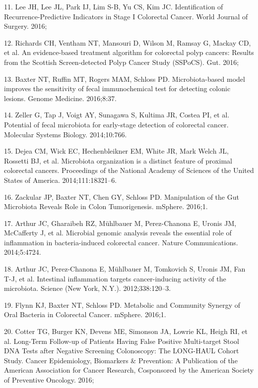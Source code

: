 \documentclass[12pt,]{article}
\begin{document}
\hypertarget{ref-lee_identification_2016}{}
11. Lee JH, Lee JL, Park IJ, Lim S-B, Yu CS, Kim JC. Identification of
Recurrence-Predictive Indicators in Stage I Colorectal Cancer. World
Journal of Surgery. 2016;

\hypertarget{ref-richards_evidence-based_2016}{}
12. Richards CH, Ventham NT, Mansouri D, Wilson M, Ramsay G, Mackay CD,
et al. An evidence-based treatment algorithm for colorectal polyp
cancers: Results from the Scottish Screen-detected Polyp Cancer Study
(SSPoCS). Gut. 2016;

\hypertarget{ref-baxter_microbiota-based_2016}{}
13. Baxter NT, Ruffin MT, Rogers MAM, Schloss PD. Microbiota-based model
improves the sensitivity of fecal immunochemical test for detecting
colonic lesions. Genome Medicine. 2016;8:37.

\hypertarget{ref-zeller_potential_2014}{}
14. Zeller G, Tap J, Voigt AY, Sunagawa S, Kultima JR, Costea PI, et al.
Potential of fecal microbiota for early-stage detection of colorectal
cancer. Molecular Systems Biology. 2014;10:766.

\hypertarget{ref-dejea_microbiota_2014}{}
15. Dejea CM, Wick EC, Hechenbleikner EM, White JR, Mark Welch JL,
Rossetti BJ, et al. Microbiota organization is a distinct feature of
proximal colorectal cancers. Proceedings of the National Academy of
Sciences of the United States of America. 2014;111:18321--6.

\hypertarget{ref-zackular_manipulation_2016}{}
16. Zackular JP, Baxter NT, Chen GY, Schloss PD. Manipulation of the Gut
Microbiota Reveals Role in Colon Tumorigenesis. mSphere. 2016;1.

\hypertarget{ref-arthur_microbial_2014}{}
17. Arthur JC, Gharaibeh RZ, Mühlbauer M, Perez-Chanona E, Uronis JM,
McCafferty J, et al. Microbial genomic analysis reveals the essential
role of inflammation in bacteria-induced colorectal cancer. Nature
Communications. 2014;5:4724.

\hypertarget{ref-arthur_intestinal_2012}{}
18. Arthur JC, Perez-Chanona E, Mühlbauer M, Tomkovich S, Uronis JM, Fan
T-J, et al. Intestinal inflammation targets cancer-inducing activity of
the microbiota. Science (New York, N.Y.). 2012;338:120--3.

\hypertarget{ref-flynn_metabolic_2016}{}
19. Flynn KJ, Baxter NT, Schloss PD. Metabolic and Community Synergy of
Oral Bacteria in Colorectal Cancer. mSphere. 2016;1.

\hypertarget{ref-cotter_long-term_2016}{}
20. Cotter TG, Burger KN, Devens ME, Simonson JA, Lowrie KL, Heigh RI,
et al. Long-Term Follow-up of Patients Having False Positive
Multi-target Stool DNA Tests after Negative Screening Colonoscopy: The
LONG-HAUL Cohort Study. Cancer Epidemiology, Biomarkers \& Prevention: A
Publication of the American Association for Cancer Research, Cosponsored
by the American Society of Preventive Oncology. 2016;
\end{document}

